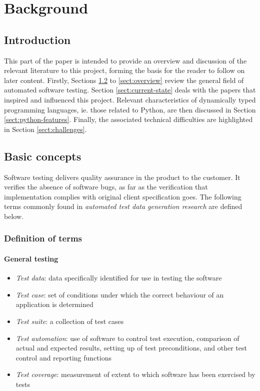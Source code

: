 \documentclass{icldt}
\numberwithin{equation}{section}       %
\begin{document}
	
	
	
	\tableofcontents
	
\chapter{Background}
\label{ch:background}
\section{Introduction}
This part of the paper is intended to provide an overview and discussion of the relevant literature to this project, forming the basis for the reader to follow on later content. Firstly, Sections \ref{sect:basics} to \ref{sect:overview} review the general field of automated software testing. Section \ref{sect:current-state} deals with the papers that inspired and influenced this project. Relevant characteristics of dynamically typed programming languages, ie. those related to Python, are then discussed in Section \ref{sect:python-features}. Finally, the associated technical difficulties are highlighted in Section \ref{sect:challenges}.
\section{Basic concepts}
\label{sect:basics}
Software testing delivers quality assurance in the product to the customer. It verifies the absence of software bugs, as far as the verification that implementation complies with original client specification goes. The following terms commonly found in \emph{automated test data generation research} are defined below.

\subsection{Definition of terms}
\subsubsection{General testing}
\begin{itemize}
	\item \emph{Test data}: data specifically identified for use in testing the software
	\item \emph{Test case}: set of conditions under which the correct behaviour of an application is determined
	\item \emph{Test suite}: a collection of test cases
	\item \emph{Test automation}: use of software to control test execution, comparison of actual and expected results, setting up of test preconditions, and other test control and reporting functions
	\item \emph{Test coverage}: measurement of extent to which software has been exercised by tests
\end{itemize}
\end{document}
